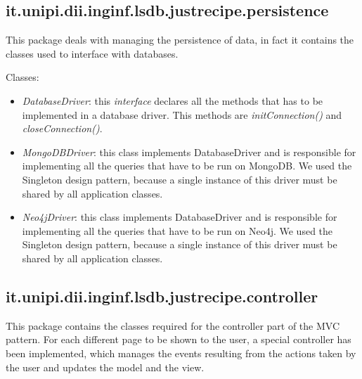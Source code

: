 \documentclass[a4paper]{report}
\begin{document}
\subsection {it.unipi.dii.inginf.lsdb.justrecipe.persistence}
This package deals with managing the persistence of data, in fact it contains the classes used to interface with databases.

\noindent Classes:
 \begin{itemize}
	\item \emph{DatabaseDriver}: this \emph{interface} declares all the methods that has to be implemented in a database driver. This methods are \emph{initConnection()} and \emph{closeConnection()}.  
	\item \emph{MongoDBDriver}: this class implements DatabaseDriver and is responsible for implementing all the queries that have to be run on MongoDB. We used the Singleton design pattern, because a single instance of this driver must be shared by all application classes.
	\item \emph{Neo4jDriver}: this class implements DatabaseDriver and is responsible for implementing all the queries that have to be run on Neo4j. We used the Singleton design pattern, because a single instance of this driver must be shared by all application classes.
\end{itemize}
\subsection {it.unipi.dii.inginf.lsdb.justrecipe.controller}
This package contains the classes required for the controller part of the MVC pattern. For each different page to be shown to the user, a special controller has been implemented, which manages the events resulting from the actions taken by the user and updates the model and the view.
\end{document}
